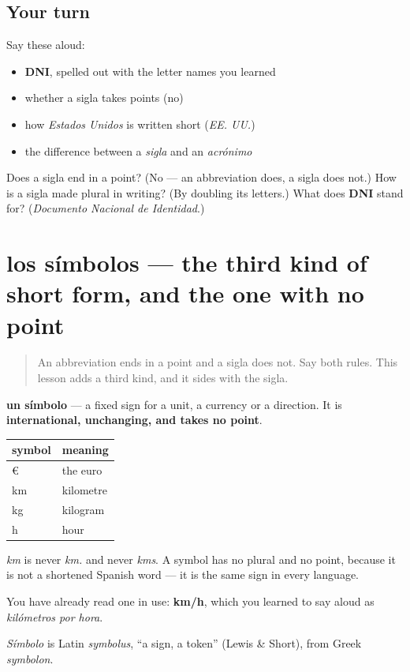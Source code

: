\subsection*{Your turn}
Say these aloud:

\begin{itemize}
\raggedright
  \item \textbf{DNI}, spelled out with the letter names you learned
  \item whether a sigla takes points (no)
  \item how \emph{Estados Unidos} is written short (\emph{EE. UU.})
  \item the difference between a \emph{sigla} and an \emph{acrónimo}
\end{itemize}

\begin{tcolorbox}[breakable,colback=teal!4,colframe=teal!35!black,title={Before you move on}]
Does a sigla end in a point? (No — an abbreviation does, a sigla does not.) How is a sigla made plural in writing? (By doubling its letters.) What does \textbf{DNI} stand for? (\emph{Documento Nacional de Identidad}.)
\end{tcolorbox}
\section[los símbolos]{los símbolos — the third kind of short form, and the one with no point}

\label{lesson:ES-C426-simbolos}



\begin{quote}
An abbreviation ends in a point and a sigla does not. Say both rules. This lesson adds a third kind, and it sides with the sigla.
\end{quote}

\begin{cousinweb}
\textbf{un símbolo} — a fixed sign for a unit, a currency or a direction. It is \textbf{international, unchanging, and takes no point}.

\noindent
\begin{tabularx}{\linewidth}{@{}>{\raggedright\arraybackslash}X>{\raggedright\arraybackslash}X@{}}
\toprule
\textbf{symbol} & \textbf{meaning} \\
\midrule
€ & the euro \\
km & kilometre \\
kg & kilogram \\
h & hour \\
\bottomrule
\end{tabularx}

\emph{km} is never \emph{km.} and never \emph{kms}. A symbol has no plural and no point, because it is not a shortened Spanish word — it is the same sign in every language.

You have already read one in use: \textbf{km/h}, which you learned to say aloud as \emph{kilómetros por hora}.

\emph{Símbolo} is Latin \emph{symbolus}, \textquotedblleft{}a sign, a token\textquotedblright{} (Lewis \& Short), from Greek \emph{symbolon}.
\end{cousinweb}

